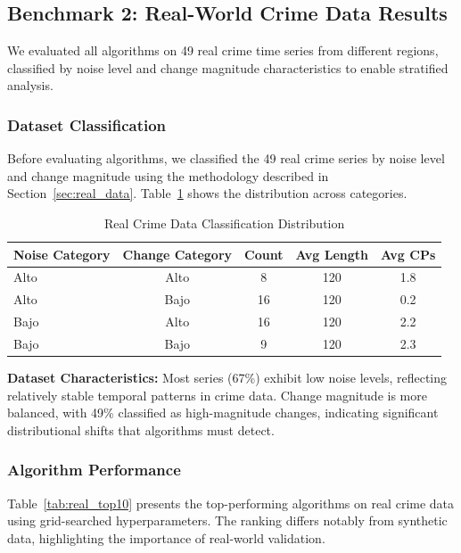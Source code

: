 \documentclass[journal,article,submit,pdftex,moreauthors]{Definitions/mdpi}
\begin{document}
\clearpage


\subsection{Benchmark 2: Real-World Crime Data Results}
\label{sec:results_real}

We evaluated all algorithms on 49 real crime time series from different regions, classified by noise level and change magnitude characteristics to enable stratified analysis.

\subsubsection{Dataset Classification}

Before evaluating algorithms, we classified the 49 real crime series by noise level and change magnitude using the methodology described in Section~\ref{sec:real_data}. Table~\ref{tab:real_classification} shows the distribution across categories.

\begin{table}[ht]
\centering
\caption{Real Crime Data Classification Distribution}
\label{tab:real_classification}
\small
\begin{tabular}{lcccc}
\toprule
\textbf{Noise Category} & \textbf{Change Category} & \textbf{Count} & \textbf{Avg Length} & \textbf{Avg CPs} \\
\midrule
Alto & Alto & 8 & 120 & 1.8 \\
Alto & Bajo & 16 & 120 & 0.2 \\
Bajo & Alto & 16 & 120 & 2.2 \\
Bajo & Bajo & 9 & 120 & 2.3 \\
\bottomrule
\end{tabular}
\end{table}

\textbf{Dataset Characteristics:} Most series (67\%) exhibit low noise levels, reflecting relatively stable temporal patterns in crime data. Change magnitude is more balanced, with 49\% classified as high-magnitude changes, indicating significant distributional shifts that algorithms must detect.


\subsubsection{Algorithm Performance}

Table~\ref{tab:real_top10} presents the top-performing algorithms on real crime data using grid-searched hyperparameters. The ranking differs notably from synthetic data, highlighting the importance of real-world validation.
\end{document}
